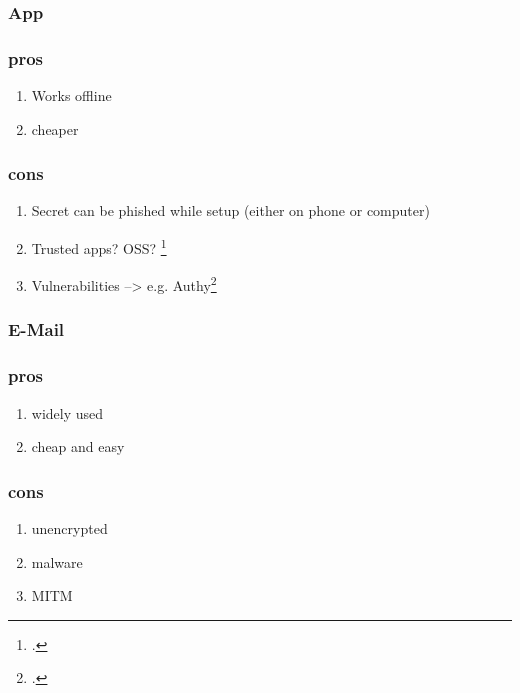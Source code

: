 
\subsubsection{App}

\subsubsection{pros}

\begin{enumerate}
	\item Works offline
	\item cheaper
\end{enumerate}

\subsubsection{cons}

\begin{enumerate}
	\item Secret can be phished while setup (either on phone or computer)
	\item Trusted apps? OSS? \footcite{eset-bypass2fa}
	\item Vulnerabilities --> e.g. Authy\footcite{sakurity-authy}
\end{enumerate}

\subsubsection{E-Mail}

\subsubsection{pros}

\begin{enumerate}
	\item widely used
	\item cheap and easy
\end{enumerate}

\subsubsection{cons}

\begin{enumerate}
	\item unencrypted
	\item malware
	\item MITM
\end{enumerate}
